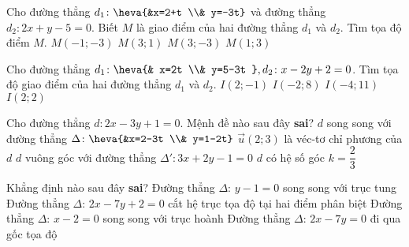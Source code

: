 	\begin{ex}%
		Cho đường thẳng $d_1 \colon \heva{&x=2+t \\& y=-3t}$ và đường thẳng $d_2 \colon 2x+y-5=0$. Biết $M$ là giao điểm của hai đường thẳng $d_1$ và $d_2$. Tìm tọa độ điểm $M$.
		\choice
		{$M(-1;-3)$}
		{$M(3;1)$}
		{$M(3;-3)$}
		{\True $M(1;3)$}
	\end{ex}
	\begin{ex}%
		Cho đường thẳng $d_1 \colon \heva{& x=2t \\& y=5-3t },d_2 \colon x-2y+2=0$. Tìm tọa độ giao điểm của hai đường thẳng $d_1$ và $d_2$.
		\choice
		{$I(2;-1)$}
		{$I(-2;8)$}
		{$I(-4;11)$}
		{\True $I(2;2)$}
	\end{ex}
	\begin{ex}%
		Cho đường thẳng $d \colon 2x-3y+1=0$. Mệnh đề nào sau đây \textbf{sai}?
		\choice
		{$d$ song song với đường thẳng $\Delta \colon \heva{&x=2-3t \\& y=1-2t}$}
		{\True $\overrightarrow{u}(2;3)$ là véc-tơ chỉ phương của $d$}
		{$d$ vuông góc với đường thẳng ${\Delta}' \colon 3x+2y-1=0$}
		{$d$ có hệ số góc $k=\dfrac{2}{3}$}
	\end{ex}
	\begin{ex}%
		Khẳng định nào sau đây \textbf{sai}?
		\choice
		{\True Đường thẳng $\Delta$: $y-1=0$ song song với trục tung}
		{Đường thẳng $\Delta$: $2x-7y+2=0$ cắt hệ trục tọa độ tại hai điểm phân biệt}
		{Đường thẳng $\Delta$: $x-2=0$ song song với trục hoành}
		{Đường thẳng $\Delta$: $2x-7y=0$ đi qua gốc tọa độ}
	\end{ex}

